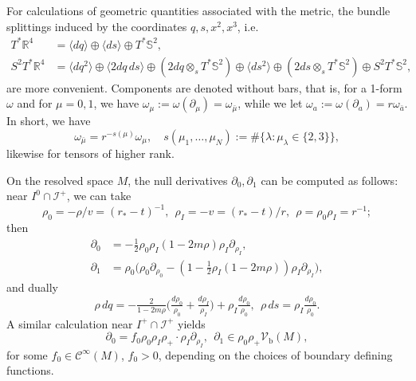 \documentclass[reqno,11pt,letterpaper]{amsart}
\numberwithin{equation}{section}
\numberwithin{figure}{section}
\theoremstyle{definition}
\theoremstyle{remark}
\newcommand{\mc}{\mathcal}
\newcommand{\cC}{\mc C}
\newcommand{\ms}{\mathscr}
\newcommand{\scri}{\ms I}
\newcommand{\R}{\mathbb{R}}
\newcommand{\Sph}{\mathbb{S}}
\newcommand{\la}{\langle}
\newcommand{\pa}{\partial}
\newcommand{\ra}{\rangle}
\newcommand{\bop}{{\mathrm{b}}}
\newcommand{\Vf}{\mathcal V}
\newcommand{\Vb}{\Vf_\bop}
\newcommand{\half}{\tfrac{1}{2}}
\newcommand{\CI}{\cC^\infty}
\begin{document}
For calculations of geometric quantities associated with the metric, the bundle splittings induced by the coordinates $q,s,x^2,x^3$, i.e.
\begin{equation}
\label{EqCptASplProd}
\begin{split}
  T^*\R^4 &= \la dq\ra \oplus \la ds\ra \oplus T^*\Sph^2, \\
  S^2 T^*\R^4 &= \la dq^2 \ra \oplus \la 2 dq\,ds \ra \oplus (2 dq\otimes_s T^*\Sph^2) \oplus \la ds^2 \ra \oplus (2 ds\otimes_s T^*\Sph^2) \oplus S^2 T^*\Sph^2,
\end{split}
\end{equation}
are more convenient. Components are denoted without bars, that is, for a 1-form $\omega$ and for $\mu=0,1$, we have $\omega_\mu:=\omega(\pa_\mu)=\omega_{\bar\mu}$, while we let $\omega_a:=\omega(\pa_a)=r\omega_{\bar a}$. In short, we have
\begin{equation}
\label{EqCptASplSphWeight}
  \omega_{\bar\mu}=r^{-s(\mu)}\omega_\mu,\quad
  s(\mu_1,\ldots,\mu_N) := \#\{\lambda\colon\mu_\lambda\in\{2,3\} \},
\end{equation}
likewise for tensors of higher rank.

On the resolved space $M$, the null derivatives $\pa_0,\pa_1$ can be computed as follows: near $I^0\cap\scri^+$, we can take
\begin{equation}
\label{EqCptASplCoords}
  \rho_0=-\rho/v=(r_*-t)^{-1},\ \ \rho_I=-v=(r_*-t)/r,\ \ \rho=\rho_0\rho_I=r^{-1};
\end{equation}
then
\begin{equation}
\label{EqCptASplNullExpl}
\begin{split}
  \pa_0 &= -\half \rho_0\rho_I(1-2 m\rho)\rho_I\pa_{\rho_I}, \\
  \pa_1 &= \rho_0\bigl(\rho_0\pa_{\rho_0} - (1-\half\rho_I(1-2 m\rho))\rho_I\pa_{\rho_I}\bigr),
\end{split}
\end{equation}
and dually
\begin{equation}
\label{EqCptASplNullDual}
  \rho\,d q =-\tfrac{2}{1-2 m\rho}\bigl(\tfrac{d\rho_0}{\rho_0}+\tfrac{d\rho_I}{\rho_I}\bigr) + \rho_I\tfrac{d\rho_0}{\rho_0}, \ \ 
  \rho\,d s = \rho_I\tfrac{d\rho_0}{\rho_0}.
\end{equation}
A similar calculation near $I^+\cap\scri^+$ yields
\begin{equation}
\label{EqCptASplNull}
  \pa_0 = f_0\rho_0\rho_I\rho_+\cdot\rho_I\pa_{\rho_I},\ \ \pa_1 \in \rho_0\rho_+\Vb(M),
\end{equation}
for some $f_0\in\CI(M)$, $f_0>0$, depending on the choices of boundary defining functions.
\end{document}
